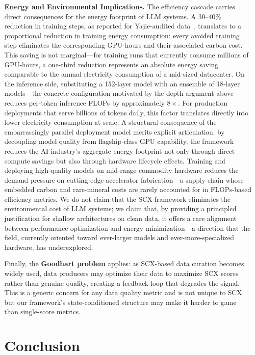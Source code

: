 \documentclass[11pt,twocolumn]{article}
\begin{document}
\textbf{Energy and Environmental Implications.}
The efficiency cascade carries direct consequences for the energy footprint of LLM systems.
A 30--40\% reduction in training steps, as reported for Yajie-audited data~\cite{scx2026}, translates to a proportional reduction in training energy consumption: every avoided training step eliminates the corresponding GPU-hours and their associated carbon cost. This saving is not marginal---for training runs that currently consume millions of GPU-hours, a one-third reduction represents an absolute energy saving comparable to the annual electricity consumption of a mid-sized datacenter.
On the inference side, substituting a 152-layer model with an ensemble of 18-layer models---the concrete configuration motivated by the depth argument above---reduces per-token inference FLOPs by approximately $8\times$. For production deployments that serve billions of tokens daily, this factor translates directly into lower electricity consumption at scale.
A structural consequence of the embarrassingly parallel deployment model merits explicit articulation: by decoupling model quality from flagship-class GPU capability, the framework reduces the AI industry's aggregate energy footprint not only through direct compute savings but also through hardware lifecycle effects. Training and deploying high-quality models on mid-range commodity hardware reduces the demand pressure on cutting-edge accelerator fabrication---a supply chain whose embedded carbon and rare-mineral costs are rarely accounted for in FLOPs-based efficiency metrics.
We do not claim that the SCX framework eliminates the environmental cost of LLM systems; we claim that, by providing a principled justification for shallow architectures on clean data, it offers a rare alignment between performance optimization and energy minimization---a direction that the field, currently oriented toward ever-larger models and ever-more-specialized hardware, has underexplored.

Finally, the \textbf{Goodhart problem} applies: as SCX-based data curation becomes widely used, data producers may optimize their data to maximize SCX scores rather than genuine quality, creating a feedback loop that degrades the signal. This is a generic concern for any data quality metric and is not unique to SCX, but our framework's state-conditioned structure may make it harder to game than single-score metrics.

\section{Conclusion}
\end{document}
